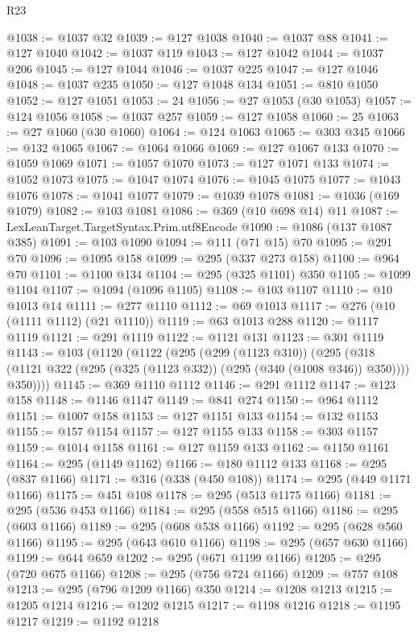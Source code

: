 \begin{lexlean}{R23}
\begin{coremodule}
@1038 := @1037 @32
@1039 := @127 @1038
@1040 := @1037 @88
@1041 := @127 @1040
@1042 := @1037 @119
@1043 := @127 @1042
@1044 := @1037 @206
@1045 := @127 @1044
@1046 := @1037 @225
@1047 := @127 @1046
@1048 := @1037 @235
@1050 := @127 @1048 @134
@1051 := @810 @1050
@1052 := @127 @1051
@1053 := 24
@1056 := @27 @1053 (@30 @1053)
@1057 := @124 @1056
@1058 := @1037 @257
@1059 := @127 @1058
@1060 := 25
@1063 := @27 @1060 (@30 @1060)
@1064 := @124 @1063
@1065 := @303 @345
@1066 := @132 @1065
@1067 := @1064 @1066
@1069 := @127 @1067 @133
@1070 := @1059 @1069
@1071 := @1057 @1070
@1073 := @127 @1071 @133
@1074 := @1052 @1073
@1075 := @1047 @1074
@1076 := @1045 @1075
@1077 := @1043 @1076
@1078 := @1041 @1077
@1079 := @1039 @1078
@1081 := @1036 (@169 @1079)
@1082 := @103 @1081
@1086 := @369 (@10 @698 @14) @11
@1087 := LexLeanTarget.TargetSyntax.Prim.utf8Encode
@1090 := @1086 (@137 @1087 @385)
@1091 := @103 @1090
@1094 := @111 (@71 @15) @70
@1095 := @291 @70
@1096 := @1095 @158
@1099 := @295 (@337 @273 @158)
@1100 := @964 @70
@1101 := @1100 @134
@1104 := @295 (@325 @1101) @350
@1105 := @1099 @1104
@1107 := @1094 (@1096 @1105)
@1108 := @103 @1107
@1110 := @10 @1013 @14
@1111 := @277 @1110
@1112 := @69 @1013
@1117 := @276 (@10 (@1111 @1112) (@21 @1110))
@1119 := @63 @1013 @288
@1120 := @1117 @1119
@1121 := @291 @1119
@1122 := @1121 @131
@1123 := @301 @1119
@1143 := @103
    (@1120
      (@1122
        (@295
          (@299 (@1123 @310))
          (@295
            (@318 (@1121 @322 (@295 (@325 (@1123 @332)) (@295 (@340 (@1008 @346)) @350))))
            @350))))
@1145 := @369 @1110 @1112
@1146 := @291 @1112
@1147 := @123 @158
@1148 := @1146 @1147
@1149 := @841 @274
@1150 := @964 @1112
@1151 := @1007 @158
@1153 := @127 @1151 @133
@1154 := @132 @1153
@1155 := @157 @1154
@1157 := @127 @1155 @133
@1158 := @303 @1157
@1159 := @1014 @1158
@1161 := @127 @1159 @133
@1162 := @1150 @1161
@1164 := @295 (@1149 @1162)
@1166 := @180 @1112 @133
@1168 := @295 (@837 @1166)
@1171 := @316 (@338 (@450 @108))
@1174 := @295 (@449 @1171 @1166)
@1175 := @451 @108
@1178 := @295 (@513 @1175 @1166)
@1181 := @295 (@536 @453 @1166)
@1184 := @295 (@558 @515 @1166)
@1186 := @295 (@603 @1166)
@1189 := @295 (@608 @538 @1166)
@1192 := @295 (@628 @560 @1166)
@1195 := @295 (@643 @610 @1166)
@1198 := @295 (@657 @630 @1166)
@1199 := @644 @659
@1202 := @295 (@671 @1199 @1166)
@1205 := @295 (@720 @675 @1166)
@1208 := @295 (@756 @724 @1166)
@1209 := @757 @108
@1213 := @295 (@796 @1209 @1166) @350
@1214 := @1208 @1213
@1215 := @1205 @1214
@1216 := @1202 @1215
@1217 := @1198 @1216
@1218 := @1195 @1217
@1219 := @1192 @1218

\end{coremodule}
\end{lexlean}
